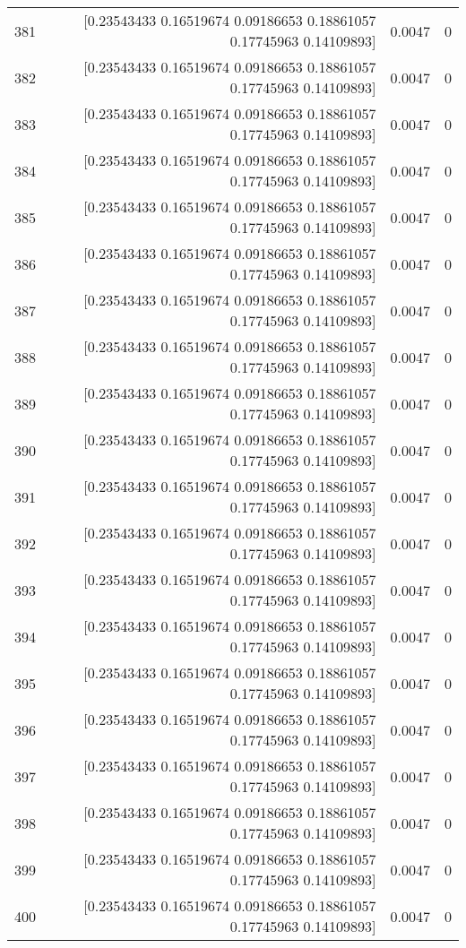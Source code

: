 \begin{longtable}{lrrr}
381 & [0.23543433 0.16519674 0.09186653 0.18861057 0.17745963 0.14109893] & 0.0047 & 0 \\
382 & [0.23543433 0.16519674 0.09186653 0.18861057 0.17745963 0.14109893] & 0.0047 & 0 \\
383 & [0.23543433 0.16519674 0.09186653 0.18861057 0.17745963 0.14109893] & 0.0047 & 0 \\
384 & [0.23543433 0.16519674 0.09186653 0.18861057 0.17745963 0.14109893] & 0.0047 & 0 \\
385 & [0.23543433 0.16519674 0.09186653 0.18861057 0.17745963 0.14109893] & 0.0047 & 0 \\
386 & [0.23543433 0.16519674 0.09186653 0.18861057 0.17745963 0.14109893] & 0.0047 & 0 \\
387 & [0.23543433 0.16519674 0.09186653 0.18861057 0.17745963 0.14109893] & 0.0047 & 0 \\
388 & [0.23543433 0.16519674 0.09186653 0.18861057 0.17745963 0.14109893] & 0.0047 & 0 \\
389 & [0.23543433 0.16519674 0.09186653 0.18861057 0.17745963 0.14109893] & 0.0047 & 0 \\
390 & [0.23543433 0.16519674 0.09186653 0.18861057 0.17745963 0.14109893] & 0.0047 & 0 \\
391 & [0.23543433 0.16519674 0.09186653 0.18861057 0.17745963 0.14109893] & 0.0047 & 0 \\
392 & [0.23543433 0.16519674 0.09186653 0.18861057 0.17745963 0.14109893] & 0.0047 & 0 \\
393 & [0.23543433 0.16519674 0.09186653 0.18861057 0.17745963 0.14109893] & 0.0047 & 0 \\
394 & [0.23543433 0.16519674 0.09186653 0.18861057 0.17745963 0.14109893] & 0.0047 & 0 \\
395 & [0.23543433 0.16519674 0.09186653 0.18861057 0.17745963 0.14109893] & 0.0047 & 0 \\
396 & [0.23543433 0.16519674 0.09186653 0.18861057 0.17745963 0.14109893] & 0.0047 & 0 \\
397 & [0.23543433 0.16519674 0.09186653 0.18861057 0.17745963 0.14109893] & 0.0047 & 0 \\
398 & [0.23543433 0.16519674 0.09186653 0.18861057 0.17745963 0.14109893] & 0.0047 & 0 \\
399 & [0.23543433 0.16519674 0.09186653 0.18861057 0.17745963 0.14109893] & 0.0047 & 0 \\
400 & [0.23543433 0.16519674 0.09186653 0.18861057 0.17745963 0.14109893] & 0.0047 & 0 \\

\end{longtable}

